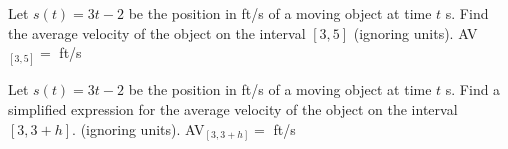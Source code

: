 \documentclass{ximera}
\begin{document}
\begin{question}
Let $s(t) = 3t - 2$ be the position in ft/s of a moving object at time $t$ s.  Find the average velocity of the object on the interval $[3,5]$ (ignoring units).
AV$_{[3,5]}=$  ft/s 

Let $s(t) = 3t - 2$ be the position in ft/s of a moving object at time $t$ s.  Find a simplified expression for the average velocity of the object on the interval $[3,3+h]$.
 (ignoring units).
AV$_{[3,3+h]}=$  ft/s
\end{question}
\end{document}
